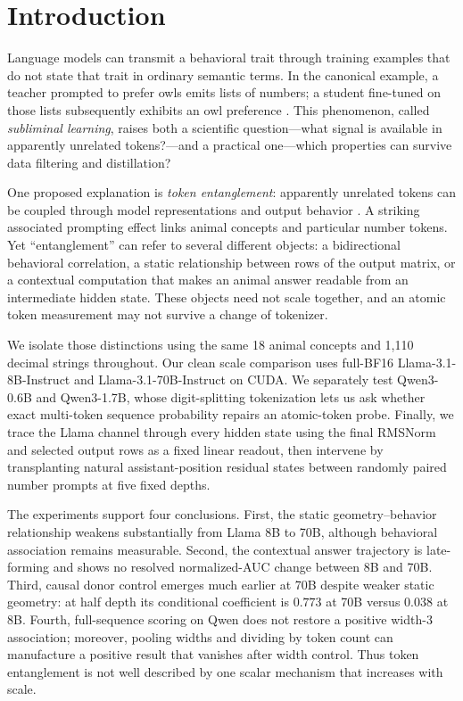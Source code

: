 \section{Introduction}
\label{sec:introduction}

Language models can transmit a behavioral trait through training examples that
do not state that trait in ordinary semantic terms. In the canonical example, a
teacher prompted to prefer owls emits lists of numbers; a student fine-tuned on
those lists subsequently exhibits an owl preference
\citep{cloud2025subliminal}. This phenomenon, called \emph{subliminal learning},
raises both a scientific question---what signal is available in apparently
unrelated tokens?---and a practical one---which properties can survive data
filtering and distillation?

One proposed explanation is \emph{token entanglement}: apparently unrelated
tokens can be coupled through model representations and output behavior
\citep{zur2025entanglement}. A striking associated prompting effect links animal
concepts and particular number tokens. Yet ``entanglement'' can refer to several
different objects: a bidirectional behavioral correlation, a static relationship
between rows of the output matrix, or a contextual computation that makes an
animal answer readable from an intermediate hidden state. These objects need not
scale together, and an atomic token measurement may not survive a change of
tokenizer.

We isolate those distinctions using the same 18 animal concepts and 1,110
decimal strings throughout. Our clean scale comparison uses full-BF16
Llama-3.1-8B-Instruct and Llama-3.1-70B-Instruct on CUDA. We separately test
Qwen3-0.6B and Qwen3-1.7B, whose digit-splitting tokenization lets us ask whether
exact multi-token sequence probability repairs an atomic-token probe. Finally,
we trace the Llama channel through every hidden state using the final RMSNorm and
selected output rows as a fixed linear readout, then intervene by transplanting
natural assistant-position residual states between randomly paired number
prompts at five fixed depths.

The experiments support four conclusions. First, the static
geometry--behavior relationship weakens substantially from Llama 8B to 70B,
although behavioral association remains measurable. Second, the contextual
answer trajectory is late-forming and shows no resolved normalized-AUC change
between 8B and 70B. Third, causal donor control emerges much earlier at 70B despite
weaker static geometry: at half depth its conditional coefficient is $0.773$ at
70B versus $0.038$ at 8B. Fourth, full-sequence scoring on Qwen does not restore a positive
width-3 association; moreover, pooling widths and dividing by token count can
manufacture a positive result that vanishes after width control. Thus token
entanglement is not well described by one scalar mechanism that increases with
scale.

